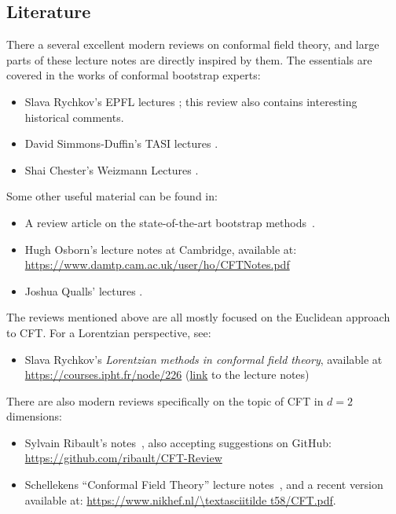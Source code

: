 \documentclass[a4paper,12pt]{article}
\numberwithin{equation}{section}
\begin{document}
\subsection{Literature}

There a several excellent modern reviews on conformal field theory, and large parts of these lecture notes are directly inspired by them.
The essentials are covered in the works of conformal bootstrap experts:
\begin{itemize}

\item
Slava Rychkov's EPFL lectures
\cite{Rychkov:2016iqz};
this review also contains interesting historical comments.

\item
David Simmons-Duffin's TASI lectures
\cite{Simmons-Duffin:2016gjk}.

\item
Shai Chester's Weizmann Lectures
\cite{Chester:2019wfx}.

\end{itemize}
%
Some other useful material can be found in:
%
\begin{itemize}

\item
A review article on the state-of-the-art bootstrap methods~\cite{Poland:2018epd}.

\item
Hugh Osborn's lecture notes at Cambridge, available at: \\ 
\url{https://www.damtp.cam.ac.uk/user/ho/CFTNotes.pdf}

\item
Joshua Qualls' lectures \cite{Qualls:2015qjb}.

\end{itemize}
%
The reviews mentioned above are all mostly focused on the Euclidean approach to CFT. For a Lorentzian perspective, see:
\begin{itemize}

\item
Slava Rychkov's \emph{Lorentzian methods in conformal field theory}, available at \url{https://courses.ipht.fr/node/226}
(\href{https://www.ipht.fr/Docspht/articles/t19/229/public/Lecture-notes-Rychkov-IPHT.pdf}{link} to the lecture notes)

\end{itemize}
%
There are also modern reviews specifically on the topic of CFT in $d = 2$ dimensions:
\begin{itemize}

\item
Sylvain Ribault's notes~\cite{Ribault:2014hia}, 
also accepting suggestions on GitHub: \\ 
\url{https://github.com/ribault/CFT-Review}

\item
Schellekens ``Conformal Field Theory'' lecture notes~\cite{Schellekens:1996tg}, and a recent version available at:
\url{https://www.nikhef.nl/\textasciitilde t58/CFT.pdf}.

\end{itemize}
\end{document}

